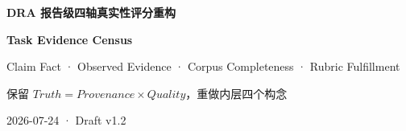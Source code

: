 \documentclass[UTF8,a4paper,10.5pt]{ctexart}
\begin{document}
\begin{titlepage}
  \centering
  \vspace*{2.7cm}
  {\Huge\bfseries\color{DraBlue}DRA 报告级四轴真实性评分重构\par}
  \vspace{0.8cm}
  {\LARGE\bfseries Task Evidence Census\par}
  \vspace{0.35cm}
  {\Large Claim Fact · Observed Evidence · Corpus Completeness · Rubric Fulfillment\par}
  \vspace{1.25cm}
  {\large 保留 $Truth=Provenance\times Quality$，重做内层四个构念\par}
  \vfill
  {\large 2026-07-24 · Draft v1.2\par}
  \vspace{0.8cm}
\end{titlepage}
\tableofcontents
\clearpage
{}
\end{document}

